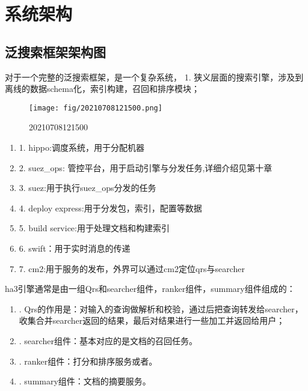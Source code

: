 
\chapter{ 系统架构 } 
\thispagestyle{empty}

\setlength{\fboxrule}{0pt}\setlength{\fboxsep}{0cm}
\noindent\shadowbox{
\begin{tcolorbox}[arc=0mm,colback=lightblue,colframe=darkblue,title=学习目标与要求]

\end{tcolorbox}}
\setlength{\fboxrule}{1pt}\setlength{\fboxsep}{4pt} 


\section{ 泛搜索框架架构图 } 

对于一个完整的泛搜索框架，是一个复杂系统，
1. 狭义层面的搜索引擎，涉及到离线的数据schema化，索引构建，召回和排序模块；


\begin{figure}[h]
\centering
\texttt{[image: fig/20210708121500.png]}
\caption{20210708121500} \label{fig:gansamples}
\end{figure}


\begin{enumerate}
   \item 1. hippo:调度系统，用于分配机器
   \item 2. suez\_ops: 管控平台，用于启动引擎与分发任务,详细介绍见第十章
   \item 3. suez:用于执行suez_ops分发的任务
   \item 4. deploy express:用于分发包，索引，配置等数据
   \item 5. build service:用于处理文档和构建索引
   \item 6. swift：用于实时消息的传递
   \item 7. cm2:用于服务的发布，外界可以通过cm2定位qrs与searcher
\end{enumerate}

ha3引擎通常是由一组Qrs和searcher组件，ranker组件，summary组件组成的：
\begin{enumerate}
\item. Qrs的作用是：对输入的查询做解析和校验，通过后把查询转发给searcher，收集合并searcher返回的结果，最后对结果进行一些加工并返回给用户；
\item. searcher组件：基本对应的是文档的召回任务。
\item. ranker组件：打分和排序服务或者。
\item. summary组件：文档的摘要服务。
\end{enumerate}

